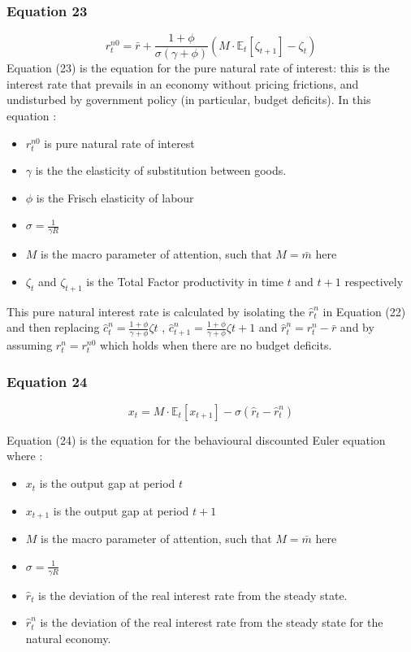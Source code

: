 \documentclass{article}
\begin{document}
\subsubsection*{Equation 23}
\begin{equation}\tag{23}
    r^{n0}_{t}=\bar{r}+\frac{1+\phi}{\sigma(\gamma+\phi)}\left(M\cdot\mathbb{E}_{t}\left[\zeta_{t+1}\right]-\zeta_{t}\right)
\end{equation}
Equation (23) is the equation for the pure natural rate of interest: this is the interest rate that prevails in an economy without pricing frictions, and undisturbed by government policy (in particular, budget deficits). In this equation : 
\begin{itemize}
    \item $r^{n0}_{t}$ is pure natural rate of interest
    \item $\gamma$ is the the elasticity of substitution between goods. 
    \item $\phi$ is the Frisch elasticity of labour
    \item $\sigma=\frac{1}{\gamma R}$ 
    \item $M$ is the macro parameter of attention, such that $M=\bar{m}$ here
    \item $\zeta_{t}$  and $\zeta_{t+1}$ is the Total Factor productivity in time $t$ and $t+1$ 
        respectively
\end{itemize}
    
This pure natural interest rate is calculated by isolating the $\hat r_{t}^{n}$ in Equation (22) and then replacing $\hat{c}_{t}^{n}=\frac{1+\phi}{\gamma+\phi}\zeta{t}$ , $\hat{c}_{t+1}^{n}=\frac{1+\phi}{\gamma+\phi}\zeta{t+1}$ and $\hat r_{t}^{n}=r_{t}^{n}-\bar{r}$ and by assuming $r_{t}^{n}=r^{n0}_{t}$ which holds when there are no budget deficits. 

\subsubsection*{Equation 24}
\begin{equation}\tag{24}
    x_{t}=M\cdot\mathbb{E}_{t}\left[x_{t+1}\right]-\sigma(\hat{r}_{t}-\hat{r}^{n}_{t})
\end{equation}

Equation (24) is the equation for the behavioural discounted Euler equation where : 
\begin{itemize}
    \item $x_{t}$ is the output gap at period $t$
    \item $x_{t+1}$ is the output gap at period $t+1$
    \item $M$ is the macro parameter of attention, such that $M=\bar{m}$ here
    \item $\sigma=\frac{1}{\gamma R}$ 
    \item $\hat r_{t}$ is the deviation of the real interest rate from the steady state.
    \item $\hat r_{t}^{n}$ is the deviation of the real interest rate from the steady state for the natural economy.
\end{itemize}
\end{document}
